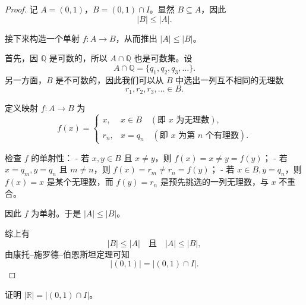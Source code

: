 \begin{proof}
记 $A=(0,1)$，$B=(0,1)\cap I$。显然 $B\subseteq A$，因此
\[
|B| \le |A|.
\]

接下来构造一个单射 $f:A\to B$，从而推出 $|A|\le |B|$。

首先，因 $\mathbb{Q}$ 是可数的，所以 $A\cap \mathbb{Q}$ 也是可数集。设
\[
A\cap \mathbb{Q} = \{q_1,q_2,q_3,\dots\}.
\]
另一方面，$B$ 是不可数的，因此我们可以从 $B$ 中选出一列互不相同的无理数
\[
r_1,r_2,r_3,\dots \in B.
\]

定义映射 $f:A\to B$ 为
\[
f(x) =
\begin{cases}
x, & x\in B \quad (\text{即 $x$ 为无理数}), \\[6pt]
r_n, & x=q_n \quad (\text{即 $x$ 为第 $n$ 个有理数}).
\end{cases}
\]

检查 $f$ 的单射性：  
- 若 $x,y\in B$ 且 $x\neq y$，则 $f(x)=x\neq y=f(y)$；  
- 若 $x=q_m,y=q_n$ 且 $m\neq n$，则 $f(x)=r_m\neq r_n=f(y)$；  
- 若 $x\in B, y=q_n$，则 $f(x)=x$ 是某个无理数，而 $f(y)=r_n$ 是预先挑选的一列无理数，与 $x$ 不重合。  

因此 $f$ 为单射。于是 $|A|\le |B|$。

综上有
\[
|B|\le |A|\quad\text{且}\quad |A|\le |B|,
\]
由康托–施罗德–伯恩斯坦定理可知
\[
|(0,1)| = |(0,1)\cap I|.
\]
\end{proof}

\begin{homework}[1.20]
证明 $|\mathbb{R}| = |(0,1)\cap I|$。
\end{homework}
